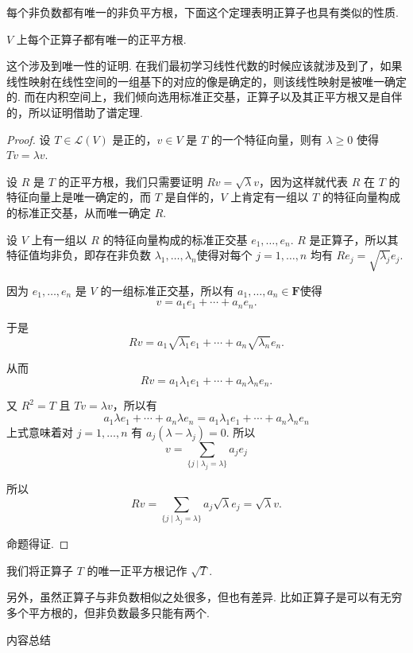 每个非负数都有唯一的非负平方根，下面这个定理表明正算子也具有类似的性质.

\begin{theorem}
    $ V $ 上每个正算子都有唯一的正平方根.
\end{theorem}

这个涉及到唯一性的证明. 在我们最初学习线性代数的时候应该就涉及到了，如果线性映射在线性空间的一组基下的对应的像是确定的，则该线性映射是被唯一确定的. 而在内积空间上，我们倾向选用标准正交基，正算子以及其正平方根又是自伴的，所以证明借助了谱定理.

\begin{proof}
    设 $ T \in \mathcal{L}(V) $ 是正的，$ v \in V $ 是 $ T $ 的一个特征向量，则有 $ \lambda \geqslant 0 $ 使得 $ Tv = \lambda v $.

    设 $ R $ 是 $ T $ 的正平方根，我们只需要证明 $ Rv = \sqrt{\lambda} v $，因为这样就代表 $ R $ 在 $ T $ 的特征向量上是唯一确定的，而 $ T $ 是自伴的，$ V $ 上肯定有一组以 $ T $ 的特征向量构成的标准正交基，从而唯一确定 $ R $.

    设 $ V $ 上有一组以 $ R $ 的特征向量构成的标准正交基 $ e_1, \ldots , e_n $. $ R $ 是正算子，所以其特征值均非负，即存在非负数 $\lambda_1, \ldots , \lambda_n $使得对每个 $ j = 1, \ldots , n $ 均有 $ Re_j = \sqrt{\lambda_j}e_j $.

    因为 $ e_1, \ldots , e_n $ 是 $ V $ 的一组标准正交基，所以有 $ a_1, \ldots , a_n \in \mathbf{F} $使得
    \[ v = a_1e_1 + \cdots + a_ne_n. \]

    于是
    \[ Rv = a_1\sqrt{\lambda_1}e_1 + \cdots + a_n\sqrt{\lambda_n}e_n. \]

    从而
    \[ Rv = a_1\lambda_1e_1 + \cdots + a_n\lambda_ne_n. \]

    又 $ R^{2} = T $ 且 $ Tv = \lambda v $，所以有
    \[ a_1\lambda e_1 + \cdots + a_n\lambda e_n = a_1\lambda_1e_1 + \cdots + a_n\lambda_ne_n \]
    上式意味着对 $ j = 1, \ldots, n $ 有 $ a_j(\lambda - \lambda_j) = 0 $. 所以
    \[ v = \sum_{\{j \mid \lambda_j = \lambda \}} a_je_j \]

    所以
    \[ Rv = \sum_{\{j \mid \lambda_j = \lambda \}} a_j\sqrt{\lambda}e_j = \sqrt{\lambda}v. \]

    命题得证.
\end{proof}

我们将正算子 $ T $ 的唯一正平方根记作 $ \sqrt{T} $.

另外，虽然正算子与非负数相似之处很多，但也有差异. 比如正算子是可以有无穷多个平方根的，但非负数最多只能有两个.

\vspace{2ex}
\centerline{\heiti \Large 内容总结}

